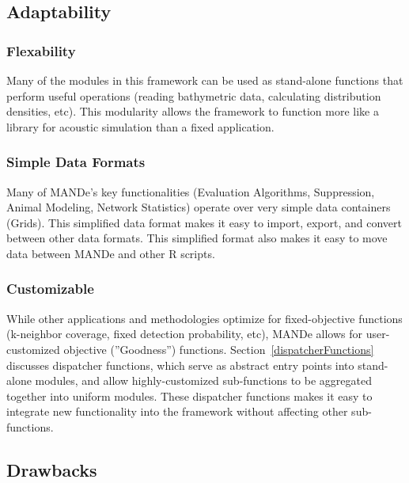 \subsection{Adaptability}
\subsubsection{Flexability}
Many of the modules in this framework can be used as stand-alone functions that perform useful operations (reading bathymetric data, calculating distribution densities, etc).  This modularity allows the framework to function more like a library for acoustic simulation than a fixed application.  

\subsubsection{Simple Data Formats}
Many of MANDe's key functionalities (Evaluation Algorithms, Suppression, Animal Modeling, Network Statistics) operate over very simple data containers (Grids).   This simplified data format makes it easy to import, export, and convert between other data formats.  This simplified format also makes it easy to move data between MANDe and other R scripts.

\subsubsection{Customizable}
While other applications and methodologies optimize for fixed-objective functions (k-neighbor coverage, fixed detection probability, etc), MANDe allows for user-customized objective (''Goodness'') functions.  Section~\ref{dispatcherFunctions} discusses dispatcher functions, which serve as abstract entry points into stand-alone modules, and allow highly-customized sub-functions to be aggregated together into uniform modules.  These dispatcher functions makes it easy to integrate new functionality into the framework without affecting other sub-functions.  

\subsection{Drawbacks}
